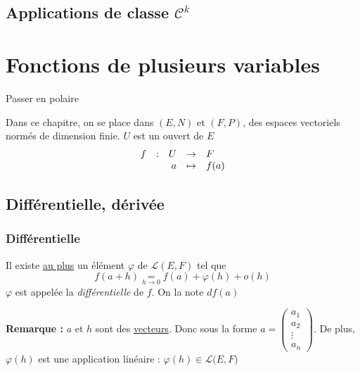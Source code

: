 \documentclass[11pt,a4paper,fleqn,pdftex]{report}
\begin{document}
\section{Applications de classe $\mathcal{C}^k$} %
\label{sec:applications_de_classe_C_k}

\chapter{Fonctions de plusieurs variables}
\begin{methode}
 \newline
Passer en polaire
\end{methode}


Dans ce chapitre, on se place dans $\left( E, N \right)$ et $\left( F,P \right)$, des espaces vectoriels normés de dimension finie. $U$ est un ouvert de $E$
\[
    \begin{array}{r c r c l}
    f&:& U &\to & F \\
     & & a &\mapsto & f(a)
    \end{array}
\]

\section{Différentielle, dérivée}
\subsection{Différentielle}
\begin{dfn}[Différentielle]
Il existe \uline{au plus} un élément $\varphi$ de $\mathscr{L}(E,F)$ tel que
\[
    f(a+h) \underset{h\to 0}{=} f(a) + \varphi(h) + o(h)
\]
$\varphi$ est appelée la \emph{différentielle} de $f$. On la note $df(a)$
\end{dfn}

\textbf{Remarque :} $a$ et $h$ sont des \uline{vecteurs}. Donc sous la forme 
$a = \begin{pmatrix}
a_1 \\
a_2 \\
\vdots \\
a_n
\end{pmatrix}
$. De plus, $\varphi (h)$ est une application linéaire : $\varphi(h) \in \mathscr{L}\big( E,F\big)$
\end{document}
